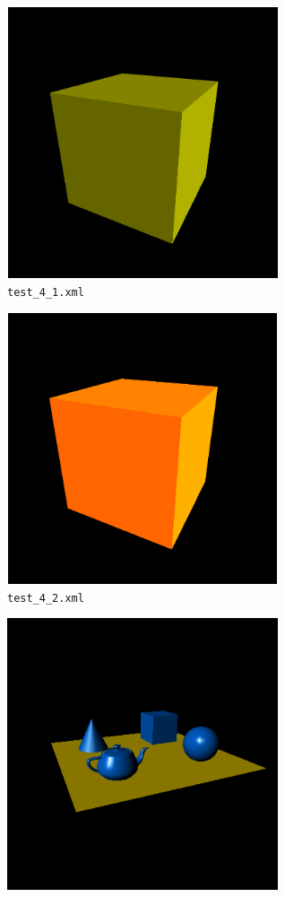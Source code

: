 \documentclass[11pt,a4paper]{report}
\begin{document}
\begin{figure}[H]
\centering
\begin{subfigure}{0.5\textwidth}
  \centering
  \includegraphics[width = 8cm,height = 8cm]{test_4_1.png}
  \caption{\texttt{test\_4\_1.xml}}
  \label{fig:test_4_1}
\end{subfigure}%
\begin{subfigure}{0.5\textwidth}
  \centering
  \includegraphics[width = 8cm,height = 8cm]{test_4_2.png}
  \caption{\texttt{test\_4\_2.xml}}
  \label{fig:test_4_2}
\end{subfigure}
\begin{subfigure}{0.5\textwidth}
  \centering
  \includegraphics[width = 8cm,height = 8cm]{test_4_3.png}

\end{subfigure}
\end{figure}
\end{document}
